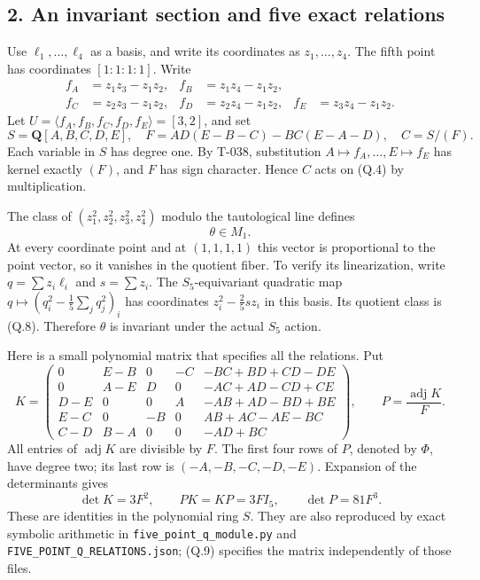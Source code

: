 \documentclass[
  10pt,
]{article}
\begin{document}
\subsection{2. An invariant section and five exact
relations}\label{an-invariant-section-and-five-exact-relations}

Use \(\ell_1,\ldots,\ell_4\) as a basis, and write its coordinates as
\(z_1,\ldots,z_4\). The fifth point has coordinates \([1:1:1:1]\). Write
\[
\begin{aligned}
f_A&=z_1z_3-z_1z_2,& f_B&=z_1z_4-z_1z_2,\\
f_C&=z_2z_3-z_1z_2,& f_D&=z_2z_4-z_1z_2,&
f_E&=z_3z_4-z_1z_2.
\end{aligned}
\tag{Q.6}
\] Let \(U=\langle f_A,f_B,f_C,f_D,f_E\rangle=[3,2]\), and set \[
S=\mathbf Q[A,B,C,D,E],\quad
F=AD(E-B-C)-BC(E-A-D),\quad C=S/(F).
\tag{Q.7}
\] Each variable in \(S\) has degree one. By T-038, substitution
\(A\mapsto f_A,\ldots,E\mapsto f_E\) has kernel exactly \((F)\), and
\(F\) has sign character. Hence \(C\) acts on (Q.4) by multiplication.

The class of \((z_1^2,z_2^2,z_3^2,z_4^2)\) modulo the tautological line
defines \[
\theta\in M_1.
\tag{Q.8}
\] At every coordinate point and at \((1,1,1,1)\) this vector is
proportional to the point vector, so it vanishes in the quotient fiber.
To verify its linearization, write \(q=\sum z_i\ell_i\) and
\(s=\sum z_i\). The \(S_5\)-equivariant quadratic map
\(q\mapsto(q_i^2-\frac15\sum_jq_j^2)_i\) has coordinates
\(z_i^2-\frac25sz_i\) in this basis. Its quotient class is (Q.8).
Therefore \(\theta\) is invariant under the actual \(S_5\) action.

Here is a small polynomial matrix that specifies all the relations. Put
\[
K=\begin{pmatrix}
0&E-B&0&-C&-BC+BD+CD-DE\\
0&A-E&D&0&-AC+AD-CD+CE\\
D-E&0&0&A&-AB+AD-BD+BE\\
E-C&0&-B&0&AB+AC-AE-BC\\
C-D&B-A&0&0&-AD+BC
\end{pmatrix},\qquad
P=\frac{\operatorname{adj}K}{F}.
\tag{Q.9}
\] All entries of \(\operatorname{adj}K\) are divisible by \(F\). The
first four rows of \(P\), denoted by \(\Phi\), have degree two; its last
row is \((-A,-B,-C,-D,-E)\). Expansion of the determinants gives \[
\det K=3F^2,\qquad PK=KP=3F I_5,\qquad\det P=81F^3.
\tag{Q.10}
\] These are identities in the polynomial ring \(S\). They are also
reproduced by exact symbolic arithmetic in
\texttt{\small five\_\allowbreak{}point\_\allowbreak{}q\_\allowbreak{}module.py}
and
\texttt{\small FIVE\_\allowbreak{}POINT\_\allowbreak{}Q\_\allowbreak{}RELATIONS.json};
(Q.9) specifies the matrix independently of those files.
\end{document}
